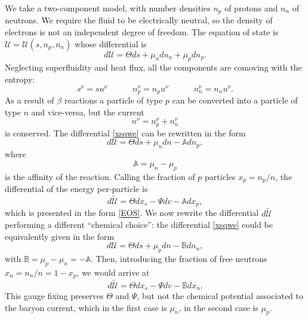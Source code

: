 \documentclass[useAMS,usenatbib,prd,twocolumn,nofootinbib]{revtex4-1}
\newcommand{\spc}{\quad \quad \quad}
\begin{document}
We take a  two-component model, with number densities $n_p$ of protons and $n_n$ of neutrons. We require the fluid to be electrically neutral, so the density of electrons is not an independent degree of freedom. The equation of state is $\mathcal{U}= \mathcal{U}(s,n_p,n_n)$ whose differential is
\begin{equation}\label{xsqwe}
d\mathcal{U} =\Theta ds + \mu_n dn_n + \mu_p dn_p .
\end{equation}
Neglecting superfluidity and heat flux,   all the components are comoving with the entropy:
\begin{equation}
s^\nu = s u^\nu \spc n_p^\nu = n_p u^\nu  \spc  n_n^\nu = n_n u^\nu .
\end{equation}
As a result of $\beta$ reactions a particle of type $p$ can be converted into a particle of type $n$ and vice-versa, but the current
\begin{equation}
n^\nu = n_p^\nu +n_n^\nu
\end{equation}
is conserved. The differential \eqref{xsqwe} can be rewritten in the form
\begin{equation}
d\mathcal{U} =\Theta ds + \mu_n dn - \mathbb{A} dn_p ,
\end{equation}
where
\begin{equation}
\mathbb{A} = \mu_n - \mu_p 
\end{equation}
is the affinity of the reaction. Calling the fraction of $p$ particles $x_p = n_p/n$, the differential of the energy per-particle is
\begin{equation}
d\tilde{\mathcal{U}} = \Theta dx_s -\Psi dv - \mathbb{A} dx_p ,
\end{equation}
which is presented in the form \eqref{EOS}. We now rewrite the differential $d\tilde{\mathcal{U}}$ performing a different ``chemical choice'': the differential \eqref{xsqwe} could be equivalently given in the form
\begin{equation}
d\mathcal{U} =\Theta ds + \mu_p dn - \mathbb{B} dn_n ,
\end{equation}
with $\mathbb{B} = \mu_p - \mu_n = -\mathbb{A}$. Then, introducing the fraction of free neutrons $x_n = n_n/n = 1-x_p$, we would arrive at 
\begin{equation}
d\tilde{\mathcal{U}} = \Theta dx_s -\Psi dv - \mathbb{B} dx_n .
\end{equation}
This gauge fixing preserves $\Theta$ and $\Psi$, but not the chemical potential associated to the baryon current, which in the first case is $\mu_n$, in the second case is $\mu_p$. 
\end{document}

